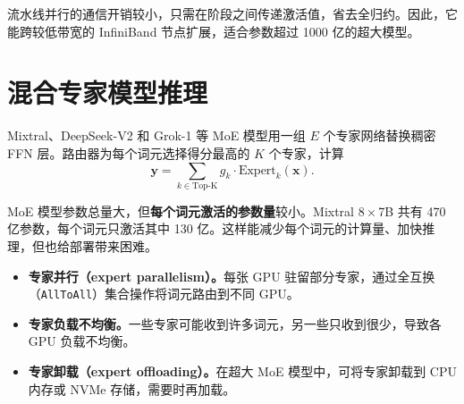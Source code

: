 流水线并行的通信开销较小，只需在阶段之间传递激活值，省去全归约。因此，它能跨较低带宽的 InfiniBand 节点扩展，适合参数超过 1000 亿的超大模型。

\section{混合专家模型推理}

Mixtral、DeepSeek-V2 和 Grok-1 等 MoE 模型用一组 \(E\) 个专家网络替换稠密 FFN 层。路由器为每个词元选择得分最高的 \(K\) 个专家，计算
\[
  \mathbf{y}=\sum_{k\in\mathrm{Top\text{-}K}}g_k\cdot\mathrm{Expert}_k(\mathbf{x}).
\]

MoE 模型参数总量大，但\textbf{每个词元激活的参数量}较小。Mixtral \(8\times\)7B 共有 470 亿参数，每个词元只激活其中 130 亿。这样能减少每个词元的计算量、加快推理，但也给部署带来困难。

\begin{itemize}
  \item \textbf{专家并行（expert parallelism）。}每张 GPU 驻留部分专家，通过全互换（\texttt{AllToAll}）集合操作将词元路由到不同 GPU。
  \item \textbf{专家负载不均衡。}一些专家可能收到许多词元，另一些只收到很少，导致各 GPU 负载不均衡。
  \item \textbf{专家卸载（expert offloading）。}在超大 MoE 模型中，可将专家卸载到 CPU 内存或 NVMe 存储，需要时再加载。
\end{itemize}

